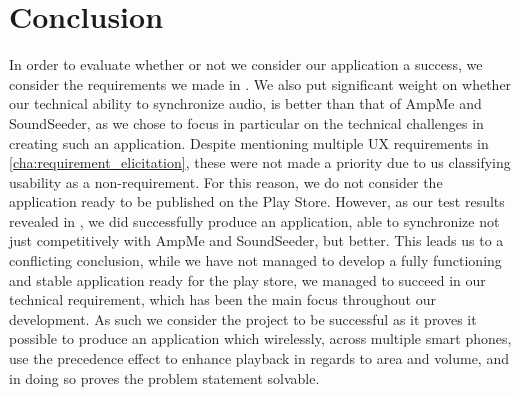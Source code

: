 \section{Conclusion}
In order to evaluate whether or not we consider our application a success, we consider the requirements we made in .
We also put significant weight on whether our technical ability to synchronize audio, is better than that of AmpMe and SoundSeeder, as we chose to focus in particular on the technical challenges in creating such an application.
Despite mentioning multiple \ac{UX} requirements in \cref{cha:requirement_elicitation}, these were not made a priority due to us classifying usability as a non-requirement.
For this reason, we do not consider the application ready to be published on the Play Store.
However, as our test results revealed in , we did successfully produce an application, able to synchronize not just competitively with AmpMe and SoundSeeder, but better.
This leads us to a conflicting conclusion, while we have not managed to develop a fully functioning and stable application ready for the play store, we managed to succeed in our technical requirement, which has been the main focus throughout our development.
As such we consider the project to be successful as it proves it possible to produce an application which wirelessly, across multiple smart phones, use the precedence effect to enhance playback in regards to area and volume, and in doing so proves the problem statement solvable.
